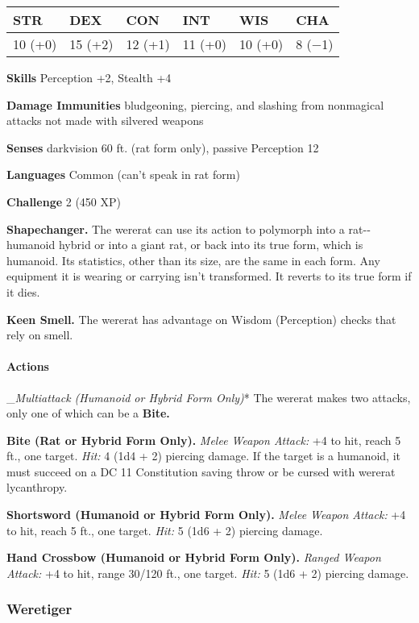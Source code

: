 \documentclass[
]{article}
\begin{document}
\begin{longtable}[]{@{}llllll@{}}
\toprule
STR & DEX & CON & INT & WIS & CHA\tabularnewline
\midrule
\endhead
10 (+0) & 15 (+2) & 12 (+1) & 11 (+0) & 10 (+0) & 8 (−1)\tabularnewline
\bottomrule
\end{longtable}

\textbf{Skills} Perception +2, Stealth +4

\textbf{Damage Immunities} bludgeoning, piercing, and slashing from
nonmagical attacks not made with silvered weapons

\textbf{Senses} darkvision 60 ft. (rat form only), passive Perception 12

\textbf{Languages} Common (can't speak in rat form)

\textbf{Challenge} 2 (450 XP)

\textbf{Shapechanger.} The wererat can use its action to polymorph into
a rat-­‐humanoid hybrid or into a giant rat, or back into its true form,
which is humanoid. Its statistics, other than its size, are the same in
each form. Any equipment it is wearing or carrying isn't transformed. It
reverts to its true form if it dies.

\textbf{Keen Smell.} The wererat has advantage on Wisdom (Perception)
checks that rely on smell.

\hypertarget{actions-5}{%
\paragraph{Actions}\label{actions-5}}

\_\emph{Multiattack (Humanoid or Hybrid Form Only)}* The wererat makes
two attacks, only one of which can be a \textbf{Bite.}

\textbf{Bite (Rat or Hybrid Form Only).} \emph{Melee Weapon Attack:} +4
to hit, reach 5 ft., one target. \emph{Hit:} 4 (1d4 + 2) piercing
damage. If the target is a humanoid, it must succeed on a DC 11
Constitution saving throw or be cursed with wererat lycanthropy.

\textbf{Shortsword (Humanoid or Hybrid Form Only).} \emph{Melee Weapon
Attack:} +4 to hit, reach 5 ft., one target. \emph{Hit:} 5 (1d6 + 2)
piercing damage.

\textbf{Hand Crossbow (Humanoid or Hybrid Form Only).} \emph{Ranged
Weapon Attack:} +4 to hit, range 30/120 ft., one target. \emph{Hit:} 5
(1d6 + 2) piercing damage.

\hypertarget{weretiger}{%
\subsubsection{Weretiger}\label{weretiger}}
\end{document}
